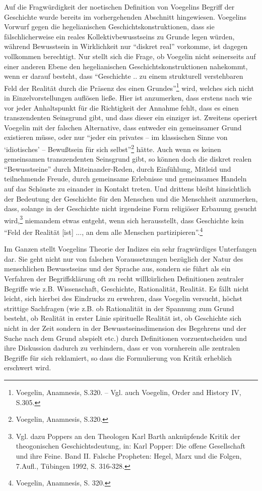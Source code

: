 Auf \label{KritikHistorischerKollektivismus} die Fragwürdigkeit der noetischen
Definition von Voegelins Begriff der Geschichte wurde bereits im
vorhergehenden Abschnitt hingewiesen. Voegelins Vorwurf gegen die
hegelianischen Geschichtskonstruktionen, dass sie fälschlicherweise ein reales
Kollektivbewusstseins zu Grunde legen würden, während Bewusstsein in
Wirklichkeit nur "`diskret real"' vorkomme, ist dagegen vollkommen berechtigt.
Nur stellt sich die Frage, ob Voegelin nicht seinerseits auf einer anderen
Ebene den hegelianischen Geschichtskonstruktionen nahekommt, wenn er darauf
besteht, dass "`Geschichte .. zu einem strukturell verstehbaren Feld der
Realität durch die Präsenz des einen Grundes"'\footnote{Voegelin, Anamnesis,
  S.320. -- Vgl. auch Voegelin, Order and History IV, S.305.} wird, welches
sich nicht in Einzelvorstellungen auflösen ließe. Hier ist anzumerken, dass
erstens nach wie vor jeder Anhaltspunkt für die Richtigkeit der Annahme fehlt,
dass es einen transzendenten Seinsgrund gibt, und dass dieser ein einziger ist.
Zweitens operiert Voegelin mit der falschen Alternative, dass entweder ein
gemeinsamer Grund existieren müsse, oder nur "`jeder ein privates -- im
klassischen Sinne von `idiotisches' -- Bewußtsein für sich
selbst"'\footnote{Voegelin, Anamnesis, S.320.} hätte. Auch wenn es keinen
gemeinsamen transzendenten Seinsgrund gibt, so können doch die diskret realen
"`Bewusstseine"' durch Miteinander-Reden, durch Einfühlung, Mitleid und
teilnehmende Freude, durch gemeinsame Erlebnisse und gemeinsames Handeln auf
das Schönste zu einander in Kontakt treten. Und drittens bleibt hinsichtlich
der Bedeutung der Geschichte für den Menschen und die Menschheit anzumerken,
dass, solange in der Geschichte nicht irgendeine Form religiöser Erbauung
gesucht wird,\footnote{Vgl. dazu Poppers an den Theologen Karl Barth
  anknüpfende Kritik der theogonischen Geschichtsdeutung, in: Karl Popper: Die
  offene Gesellschaft und ihre Feine. Band II. Falsche Propheten: Hegel, Marx
  und die Folgen, 7.Aufl., Tübingen 1992, S. 316-328.} niemandem etwas
entgeht, wenn sich herausstellt, dass Geschichte kein "`Feld der Realität [ist]
..., an dem alle Menschen partizipieren"'.\footnote{Voegelin, Anamnesis,
  S. 320.}

Im Ganzen stellt Voegelins Theorie der Indizes ein sehr fragwürdiges
Unterfangen dar. Sie geht nicht nur von falschen Voraussetzungen bezüglich der
Natur des menschlichen Bewusstseins und der Sprache aus, sondern sie führt als
ein Verfahren der Begriffsklärung oft zu recht willkürlichen Definitionen
zentraler Begriffe wie z.B. Wissenschaft, Geschichte, Rationalität, Realität.
Es fällt nicht leicht, sich hierbei des Eindrucks zu erwehren, dass Voegelin
versucht, höchst strittige Sachfragen (wie z.B. ob Rationalität in
der Spannung zum Grund besteht, ob Realität in erster Linie spirituelle
Realität ist, ob Geschichte sich nicht in der Zeit sondern in der
Bewusstseinsdimension des Begehrens und der Suche nach dem Grund abspielt etc.)
durch Definitionen vorzuentscheiden und ihre Diskussion dadurch zu verhindern,
dass er von vornherein alle zentralen Begriffe für sich reklamiert, so dass
die Formulierung von Kritik erheblich erschwert wird.






